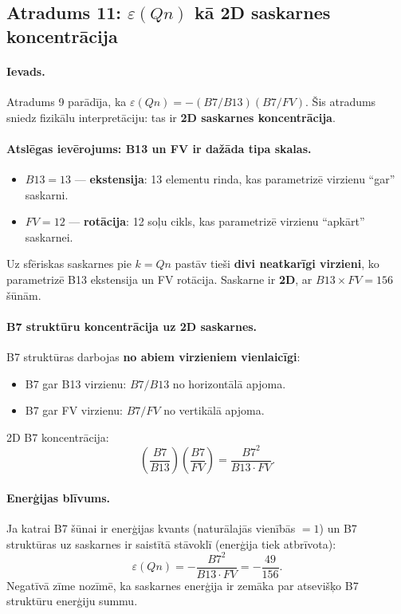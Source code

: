 \documentclass[12pt,a4paper]{article}
\begin{document}
\subsection*{Atradums 11: $\varepsilon(Qn)$ kā 2D saskarnes koncentrācija}

\paragraph{Ievads.}
Atradums 9 parādīja, ka $\varepsilon(Qn) = -(B7/B13)(B7/FV)$. Šis atradums sniedz fizikālu interpretāciju: tas ir \textbf{2D saskarnes koncentrācija}.

\paragraph{Atslēgas ievērojums: B13 un FV ir dažāda tipa skalas.}
\begin{itemize}
    \item $B13 = 13$ — \textbf{ekstensija}: 13 elementu rinda, kas parametrizē virzienu ``gar'' saskarni.
    \item $FV = 12$ — \textbf{rotācija}: 12 soļu cikls, kas parametrizē virzienu ``apkārt'' saskarnei.
\end{itemize}

Uz sfēriskas saskarnes pie $k = Qn$ pastāv tieši \textbf{divi neatkarīgi virzieni}, ko parametrizē B13 ekstensija un FV rotācija. Saskarne ir \textbf{2D}, ar $B13 \times FV = 156$ šūnām.

\paragraph{B7 struktūru koncentrācija uz 2D saskarnes.}
B7 struktūras darbojas \textbf{no abiem virzieniem vienlaicīgi}:
\begin{itemize}
    \item B7 gar B13 virzienu: $B7/B13$ no horizontālā apjoma.
    \item B7 gar FV virzienu: $B7/FV$ no vertikālā apjoma.
\end{itemize}

2D B7 koncentrācija:
\[
\left(\frac{B7}{B13}\right)\left(\frac{B7}{FV}\right) = \frac{B7^2}{B13 \cdot FV}.
\]

\paragraph{Enerģijas blīvums.}
Ja katrai B7 šūnai ir enerģijas kvants (naturālajās vienībās $= 1$) un B7 struktūras uz saskarnes ir saistītā stāvoklī (enerģija tiek atbrīvota):
\[
\varepsilon(Qn) = -\frac{B7^2}{B13 \cdot FV} = -\frac{49}{156}.
\]
Negatīvā zīme nozīmē, ka saskarnes enerģija ir zemāka par atsevišķo B7 struktūru enerģiju summu.
\end{document}
